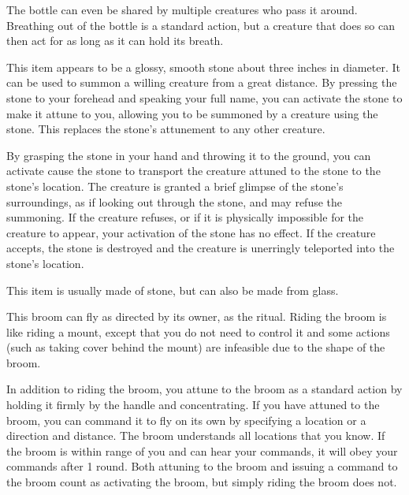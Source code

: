 The bottle can even be shared by multiple creatures who pass it around. Breathing out of the bottle is a standard action, but a creature that does so can then act for as long as it can hold its breath.


 This item appears to be a glossy, smooth stone about three inches in diameter. It can be used to summon a willing creature from a great distance. By pressing the stone to your forehead and speaking your full name, you can activate the stone to make it attune to you, allowing you to be summoned by a creature using the stone. This replaces the stone's attunement to any other creature.

By grasping the stone in your hand and throwing it to the ground, you can activate cause the stone to transport the creature attuned to the stone to the stone's location. The creature is granted a brief glimpse of the stone's surroundings, as if looking out through the stone, and may refuse the summoning. If the creature refuses, or if it is physically impossible for the creature to appear, your activation of the stone has no effect. If the creature accepts, the stone is destroyed and the creature is unerringly teleported into the stone's location.

This item is usually made of stone, but can also be made from glass.


 This broom can fly as directed by its owner, as the  ritual. Riding the broom is like riding a mount, except that you do not need to control it and some actions (such as taking cover behind the mount) are infeasible due to the shape of the broom.

In addition to riding the broom, you attune to the broom as a standard action by holding it firmly by the handle and concentrating. If you have attuned to the broom, you can command it to fly on its own by specifying a location or a direction and distance. The broom understands all locations that you know. If the broom is within \rngext range of you and can hear your commands, it will obey your commands after 1 round. Both attuning to the broom and issuing a command to the broom count as activating the broom, but simply riding the broom does not.

